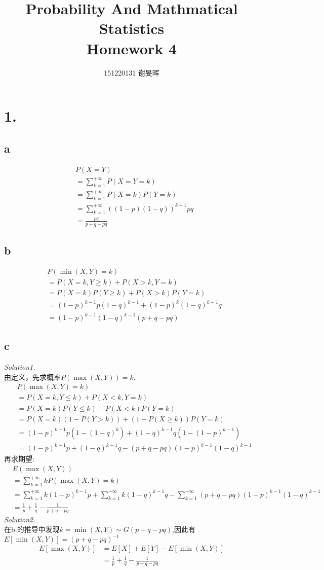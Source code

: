 \documentclass[a4paper,twocolumn]{ctexart}
\title{Probability And Mathmatical Statistics\\Homework 4}
\author{151220131 谢旻晖}
\date{}
\begin{document}
\maketitle
\section*{1.}
\subsection*{a}
\begin{align*}
&P(X=Y)\\
&=\sum_{k=1}^{+\infty}P(X=Y=k)\\
&=\sum_{k=1}^{+\infty}P(X=k)P(Y=k)\\
&=\sum_{k=1}^{+\infty}\left(\left(1-p\right)\left(1-q\right)\right)^{k-1}pq\\
&=\frac{pq}{p+q-pq}
\end{align*}
\subsection*{b}
\begin{align*}
&P(\min\left(X,Y\right)=k)\\
&=P(X=k,Y\ge k)+P(X>k,Y=k)\\
&=P(X=k)P(Y\ge k)+P(X>k)P(Y=k)\\
&=(1-p)^{k-1}p(1-q)^{k-1}+(1-p)^k(1-q)^{k-1}q\\
&=(1-p)^{k-1}(1-q)^{k-1}(p+q-pq)
\end{align*}

\subsection*{c}
\noindent \textit{Solution1.}\\
由定义，先求概率$P(\max(X,Y))=k$.\\
\begin{align*}
&P(\max(X,Y)=k)\\
&=P(X=k,Y\le k)+P(X<k,Y=k)\\
&=P(X=k)P(Y\le k)+P(X<k)P(Y=k)\\
&=P(X=k)(1-P(Y>k))+(1-P(X\ge k))P(Y=k)\\
&=(1-p)^{k-1}p(1-(1-q)^k)+(1-q)^{k-1}q(1-(1-p)^{k-1})\\
&=(1-p)^{k-1}p+(1-q)^{k-1}q-(p+q-pq)(1-p)^{k-1}(1-q)^{k-1}
\end{align*}
再求期望:
\begin{align*}
&E(\max(X,Y))\\
&=\sum_{k=1}^{+\infty}kP(\max (X,Y)=k)\\
&=\sum_{k=1}^{+\infty}k(1-p)^{k-1}p+\sum_{k=1}^{+\infty}k(1-q)^{k-1}q-\sum_{k=1}^{+\infty}(p+q-pq)(1-p)^{k-1}(1-q)^{k-1}\\
&=\frac{1}{p}+\frac{1}{q}-\frac{1}{p+q-pq}
\end{align*}
\noindent \textit{Solution2.}\\
在b.的推导中发现$k=\min(X,Y)\sim G(p+q-pq)$,因此有$E[\min(X,Y)]=(p+q-pq)^{-1}$
\begin{align*}
E[\max(X,Y)]&=E[X]+E[Y]-E[\min(X,Y)]\\
&=\frac{1}{p}+\frac{1}{q}-\frac{1}{p+q-pq}
\end{align*}
\end{document}
